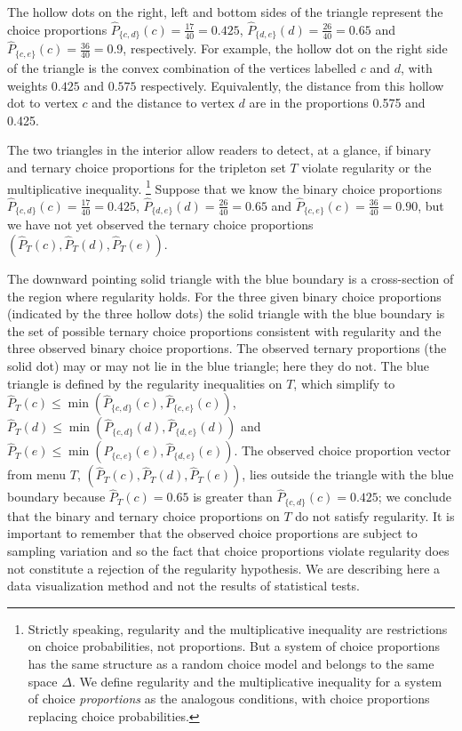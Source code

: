 \documentclass[11pt,letter]{article}
\newcommand{\menu}{menu}
\newcommand{\trip}{T}
\begin{document}
The hollow dots on the right, left and bottom sides of the triangle represent the choice proportions $\hat P_{\{c,d\}}(c) = \tfrac{17}{40} = 0.425$, $\hat P_{\{d,e\}}(d) = \tfrac{26}{40} = 0.65$ and $\hat P_{\{c,e\}}(c) = \tfrac{36}{40} = 0.9$, respectively.
For example, the hollow dot on the right side of the triangle is the convex combination of the vertices labelled $c$ and $d$, with weights $0.425$ and $0.575$ respectively.
Equivalently, the distance from this hollow dot to vertex $c$ and the distance to vertex $d$ are in the proportions 0.575 and 0.425.

The two triangles in the interior allow readers to detect, at a glance, if binary and ternary choice proportions for the tripleton set $\trip$ violate regularity or the multiplicative inequality.
\footnote{Strictly speaking, regularity and the multiplicative inequality are restrictions on choice probabilities, not proportions.
But a system of choice proportions has the same structure as a random choice model and belongs to the same space $\Delta$.
We define regularity and the multiplicative inequality for a system of choice {\em proportions} as the analogous conditions, with choice proportions replacing choice probabilities.}
Suppose that we know the binary choice proportions $\hat P_{\{c,d\}}(c) = \tfrac{17}{40} = 0.425$, $\hat P_{\{d,e\}}(d) = \tfrac{26}{40} = 0.65$ and $\hat P_{\{c,e\}}(c) = \tfrac{36}{40} = 0.90$, but we have not yet observed the ternary choice proportions $(\hat P_\trip(c), \hat P_\trip(d), \hat P_\trip(e))$.

The downward pointing solid triangle with the blue boundary is a cross-section of the region where regularity holds.
For the three given binary choice proportions (indicated by the three hollow dots) the solid triangle with the blue boundary is the set of possible ternary choice proportions consistent with regularity and the three observed binary choice proportions.
The observed ternary proportions (the solid dot) may or may not lie in the blue triangle; here they do not.
The blue triangle is defined by the regularity inequalities on $\trip$, which simplify to
$\hat P_\trip(c) \leq \min(\hat P_{\{c,d\}}(c), \hat P_{\{c,e\}}(c))$,
$\hat P_\trip(d) \leq \min(\hat P_{\{c,d\}}(d), \hat P_{\{d,e\}}(d))$ and
$\hat P_\trip(e) \leq \min(\hat P_{\{c,e\}}(e), \hat P_{\{d,e\}}(e))$.
The observed choice proportion vector from \menu{} $\trip$, $(\hat P_\trip(c), \hat P_\trip(d), \hat P_\trip(e))$, lies outside the triangle with the blue boundary because $\hat P_\trip(c) = 0.65$ is greater than $\hat P_{\{c,d\}}(c) = 0.425$; we conclude that the binary and ternary choice proportions on $\trip$ do not satisfy regularity.
It is important to remember that the observed choice proportions are subject to sampling variation and so the fact that choice proportions violate regularity does not constitute a rejection of the regularity hypothesis.
We are describing here a data visualization method and not the results of statistical tests.
\end{document}
